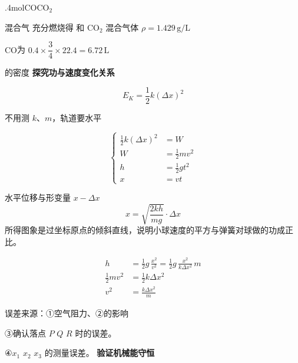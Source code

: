 .4mol\quad $\mathrm{CO}$\quad $\mathrm{CO_2}$

混合气 充分燃烧得  和 $\mathrm{CO_2}$ 混合气体 $\rho=1.429\,\mathrm{g/L}$

$\mathrm{CO}$为 $0.4\times\dfrac{3}{4}\times22.4=6.72\,\mathrm{L}$

的密度 %
\textbf{探究功与速度变化关系}

\[ E_K=\frac12 k(\Delta x)^2 \]

不用测 $k$、$m$，轨道要水平


\[
\left\{\begin{aligned}
\tfrac12 k(\Delta x)^2&=W\\
W&=\tfrac12 mv^2\\
h&=\tfrac12 gt^2\\
x&=vt
\end{aligned}\right.
\]

水平位移与形变量 $x-\Delta x$
\[ x=\sqrt{\frac{2kh}{mg}}\cdot\Delta x \]
所得图象是过坐标原点的倾斜直线，说明小球速度的平方与弹簧对球做的功成正比。

\begin{align*}
h&=\frac12 g\,\frac{x^2}{v^2}=\frac12 g\,\frac{x^2}{k\Delta x^2}\,m\\
\frac12 mv^2&=\frac12 k\Delta x^2\\
v^2&=\frac{k\Delta x^2}{m}
\end{align*}

误差来源：①空气阻力、②的影响

③确认落点 $P$ $Q$ $R$ 时的误差。 %

④$x_1$ $x_2$ $x_3$ 的测量误差。
\textbf{验证机械能守恒}


